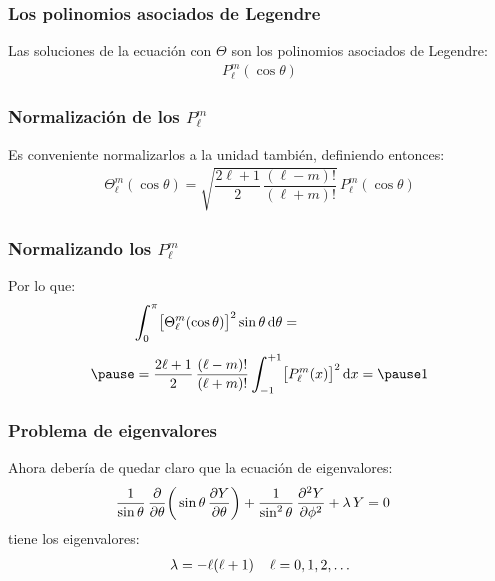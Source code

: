 \documentclass[12pt]{beamer}
\begin{document}
\begin{frame}
\frametitle{Los polinomios asociados de Legendre}
Las soluciones de la ecuación con $\Theta$ son los polinomios asociados de Legendre:
\begin{align*}
P_{\ell}^{m} (\cos \theta)
\end{align*}
\end{frame}
\begin{frame}
\frametitle{Normalización de los $P_{\ell}^{m}$}
Es conveniente normalizarlos a la unidad también, definiendo entonces:
\pause
\begin{align*}
\Theta_{\ell}^{m} (\cos \theta) = \sqrt{\dfrac{2 \ell + 1}{2} \, \dfrac{(\ell - m)!}{(\ell + m)!}} \, P_{\ell}^{m} (\cos \theta)
\end{align*}
\end{frame}
\begin{frame}
\frametitle{Normalizando los $P_{\ell}^{m}$}
Por lo que:
\pause
\begin{eqnarray*}
\begin{aligned}
&\scaleint{6ex}_{\bs 0}^{\pi} \big[ \Theta_{\ell}^{m} (\cos \theta) \big]^{2} \sin \theta \dd{\theta} = \\[0.5em] \pause
&=\dfrac{2 \ell + 1}{2} \, \dfrac{(\ell - m)!}{(\ell + m)!} \, \scaleint{6ex}_{\bs -1}^{+1} \big[ P_{\ell}^{m}  (x) \big]^{2} \dd{x} = \pause 1
\end{aligned}
\end{eqnarray*}
\end{frame}
\begin{frame}
\frametitle{Problema de eigenvalores}
Ahora debería de quedar claro que la ecuación de eigenvalores:
\pause
\begin{align*}
\dfrac{1}{\sin \theta} \, \pdv{\theta} \bigg( \sin \theta \, \pdv{Y}{\theta} \bigg) &+ \dfrac{1}{\sin^{2} \theta} \, \pdv[2]{Y}{\phi} + \lambda \, Y = 0
\end{align*}
\pause
tiene los eigenvalores:
\pause
\begin{align*}
\lambda = - \ell (\ell + 1) \hspace{0.4cm} \ell = 0, 1, 2, \ldots
\end{align*}
\end{frame}
\end{document}
